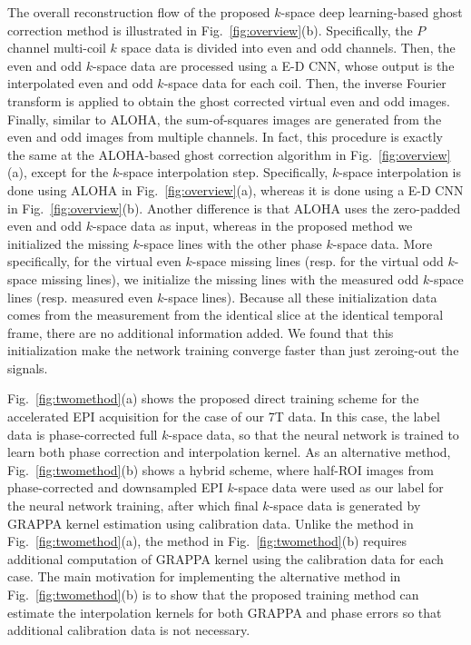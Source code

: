 \documentclass[num-refs]{wiley-article}
\newcommand{\0}{{\boldsymbol{0}}}
\newcommand{\1}{\blmath{1}}
\begin{document}
	The overall reconstruction flow of the proposed $k$-space deep learning-based ghost correction method  is illustrated in Fig.~\ref{fig:overview}(b). 
	Specifically, the $ P $ channel multi-coil $ k $ space data is divided into even and odd channels. Then, the even and odd $k$-space data are processed using a E-D CNN, whose output is the interpolated even and odd $k$-space data for each coil.
	Then, the inverse Fourier transform is applied to obtain the ghost corrected virtual even and odd images.
	Finally, similar to ALOHA,  the sum-of-squares images are generated from the even and odd images from multiple channels. In fact, this procedure is exactly the same at the ALOHA-based ghost correction algorithm in Fig.~\ref{fig:overview}(a), except for the $k$-space interpolation step. Specifically, $k$-space interpolation is done using ALOHA in Fig.~\ref{fig:overview}(a), whereas it is done using a E-D CNN in  Fig.~\ref{fig:overview}(b).
	Another difference is that ALOHA uses the zero-padded even and odd $k$-space data as input, whereas in the proposed method we initialized the missing $k$-space lines with the other phase $k$-space data.
	More specifically, for the virtual even $k$-space missing lines (resp. for the virtual odd $k$-space missing lines),
	we initialize the missing lines with the measured odd $k$-space lines (resp. measured  even $k$-space lines).  Because all these initialization data comes from the measurement from the identical slice at the identical temporal frame, there are no additional information added. We found that this initialization make the network training converge faster than just zeroing-out the signals.
	
	
	Fig.~\ref{fig:twomethod}(a) shows the proposed direct training scheme for the accelerated EPI acquisition
	for the case of our 7T data.  In this case, the label data is phase-corrected full $k$-space data, so that the neural
	network is trained to learn both phase correction and interpolation kernel. As an alternative method,  Fig.~\ref{fig:twomethod}(b) shows  a hybrid scheme, where half-ROI images from phase-corrected  and downsampled EPI $k$-space data  were used as our label for the neural network training, after which final $k$-space data is generated by GRAPPA kernel estimation using calibration data. Unlike the method in Fig.~\ref{fig:twomethod}(a), the method in Fig.~\ref{fig:twomethod}(b) requires additional computation of GRAPPA kernel using the
	calibration data for each case. The main motivation for implementing the alternative method in Fig.~\ref{fig:twomethod}(b) is to show that the proposed training method can estimate the interpolation kernels for both GRAPPA and phase errors so that additional calibration data is not necessary.
	
\end{document}
